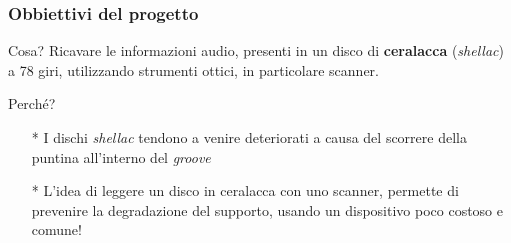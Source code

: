 \begin{frame}

\frametitle{Obbiettivi del progetto}

\begin{block}{Cosa?}
Ricavare le informazioni audio, presenti in un disco di \textbf{ceralacca}
(\emph{shellac}) a 78 giri, utilizzando strumenti ottici, in particolare scanner.
\end{block}

\begin{block}{Perché?}
\begin{itemize}
\item[*]I dischi \emph{shellac} tendono a venire deteriorati a causa del
scorrere della puntina all'interno del \emph{groove}
\item[*]L'idea di leggere un disco in ceralacca con uno scanner, permette
di prevenire la degradazione del supporto, usando un dispositivo poco costoso
e comune!
\end{itemize}
\end{block}

\end{frame}
